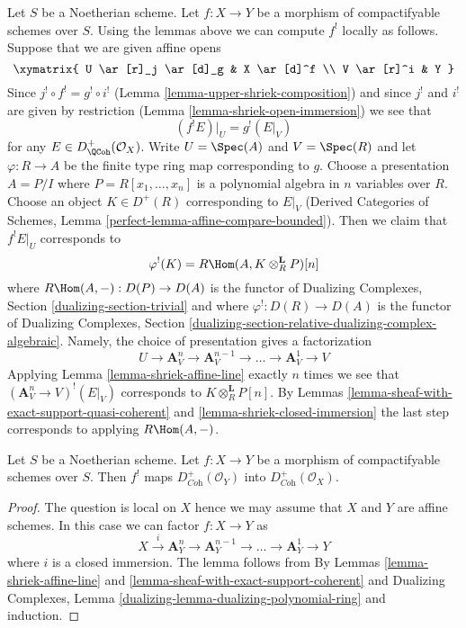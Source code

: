 \begin{remark}
\label{remark-local-calculation-shriek}
Let $S$ be a Noetherian scheme. Let $f : X \to Y$ be a morphism of
compactifyable schemes over $S$. Using the lemmas above we can compute
$f^!$ locally as follows. Suppose that we are given affine opens
$$
\xymatrix{
U \ar[r]_j \ar[d]_g & X \ar[d]^f \\
V \ar[r]^i & Y
}
$$
Since $j^! \circ f^! = g^! \circ i^!$
(Lemma \ref{lemma-upper-shriek-composition})
and since $j^!$ and $i^!$ are given by restriction
(Lemma \ref{lemma-shriek-open-immersion})
we see that
$$
(f^!E)|_U = g^!(E|_V)
$$
for any $E \in D^+_\QCoh(\mathcal{O}_X)$. Write
$U = \Spec(A)$ and $V = \Spec(R)$ and let $\varphi : R \to A$
be the finite type ring map corresponding to $g$.
Choose a presentation $A = P/I$ where $P = R[x_1, \ldots, x_n]$
is a polynomial algebra in $n$ variables over $R$. Choose an
object $K \in D^+(R)$ corresponding to $E|_V$
(Derived Categories of Schemes, Lemma
\ref{perfect-lemma-affine-compare-bounded}).
Then we claim that $f^!E|_U$ corresponds to
$$
\varphi^!(K) = R\Hom(A, K \otimes_R^\mathbf{L} P)[n]
$$
where $R\Hom(A, -) : D(P) \to D(A)$ is the functor of
Dualizing Complexes, Section \ref{dualizing-section-trivial}
and where $\varphi^! : D(R) \to D(A)$ is the functor of
Dualizing Complexes, Section
\ref{dualizing-section-relative-dualizing-complex-algebraic}.
Namely, the choice of presentation
gives a factorization
$$
U \rightarrow \mathbf{A}^n_V \to \mathbf{A}^{n - 1}_V \to \ldots \to
\mathbf{A}^1_V \to V
$$
Applying Lemma \ref{lemma-shriek-affine-line} exactly $n$ times we see that
$(\mathbf{A}^n_V \to V)^!(E|_V)$ corresponds to
$K \otimes_R^\mathbf{L} P[n]$. By Lemmas
\ref{lemma-sheaf-with-exact-support-quasi-coherent} and
\ref{lemma-shriek-closed-immersion} the last step corresponds to
applying $R\Hom(A, -)$.
\end{remark}

\begin{lemma}
\label{lemma-shriek-coherent}
Let $S$ be a Noetherian scheme. Let $f : X \to Y$ be a morphism
of compactifyable schemes over $S$. Then $f^!$ maps
$D_{\textit{Coh}}^+(\mathcal{O}_Y)$ into $D_{\textit{Coh}}^+(\mathcal{O}_X)$.
\end{lemma}

\begin{proof}
The question is local on $X$ hence we may assume that $X$ and $Y$ are
affine schemes. In this case we can factor $f : X \to Y$ as
$$
X \xrightarrow{i} \mathbf{A}^n_Y \to \mathbf{A}^{n - 1}_Y \to \ldots \to
\mathbf{A}^1_Y \to Y
$$
where $i$ is a closed immersion. The lemma follows from
By Lemmas \ref{lemma-shriek-affine-line} and
\ref{lemma-sheaf-with-exact-support-coherent} and
Dualizing Complexes, Lemma
\ref{dualizing-lemma-dualizing-polynomial-ring}
and induction.
\end{proof}

